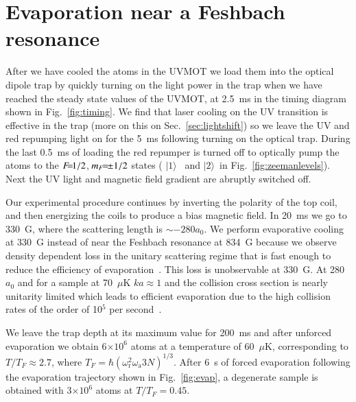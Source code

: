 \documentclass[oneside,12pt]{memoir}
\newcommand{\cm}{\ensuremath{,\hspace{1pt}}}
\newcommand{\f}[1]{\ensuremath{F\hspace{-5pt}=\hspace{-4pt}#1}}
\newcommand{\mf}[1]{\ensuremath{m_{F}\hspace{-4pt}=\hspace{-4pt}#1}}
\newcommand{\TF}{\ensuremath{ T_{F} }}
\newcommand{\one}{\ensuremath{|1\rangle }\ }
\newcommand{\two}{\ensuremath{|2\rangle }\ }
\begin{document}
\section{Evaporation near a Feshbach resonance}

After we have cooled the atoms in the UVMOT we load them into the optical
dipole trap by quickly turning on the light power in the trap when we have
reached the steady state values of the UVMOT, at 2.5~ms in the timing diagram
shown in Fig.~\ref{fig:timing}.  We find that laser cooling on the UV
transition is effective in the trap (more on this on Sec.~\ref{sec:lightshift})
so we leave the UV and red repumping light on for the 5~ms following turning on
the optical trap.  During the last 0.5~ms of loading the red repumper is turned
off to optically pump the atoms to the \f{1/2}\cm$\mf{\pm1/2}$ states ( \one
and \two  in Fig.~\ref{fig:zeemanlevels}).  Next the UV light and magnetic field
gradient are abruptly switched off. 

Our experimental procedure continues by inverting the polarity of the top coil,
and then energizing the coils to produce a bias magnetic field.   In 20~ms we
go to 330~G, where the scattering length is $\sim -280a_{0}$.  We perform
evaporative cooling at 330~G instead of near the Feshbach resonance at 834~G
because we observe density dependent loss in the unitary scattering regime that
is fast enough to reduce the efficiency of evaporation~\cite{Du2009}.  This
loss is unobservable at 330~G.  At 280 $a_{0}$ and for a sample at 70~$\mu$K
$ka \approx 1$  and the collision cross section is nearly unitarity limited
which leads to efficient evaporation due to the high collision rates of the
order of 10$^{5}$ per second~\cite{Gehm2003}. 


We leave the trap depth at its maximum value for 200~ms and after unforced
evaporation we obtain 6$\times 10^{6}$ atoms at a temperature of 60~$\mu$K,
corresponding to $T/\TF \approx 2.7$, where $\TF= \hbar
(\omega_{\mathrm{r}}^{2} \omega_{\mathrm{a}} 3N)^{1/3}$.  After 6~s of forced
evaporation following the evaporation trajectory shown in Fig.~\ref{fig:evap},
a degenerate sample is obtained with 3$\times 10^{6}$ atoms at $T/\TF = 0.45$. 
\end{document}
